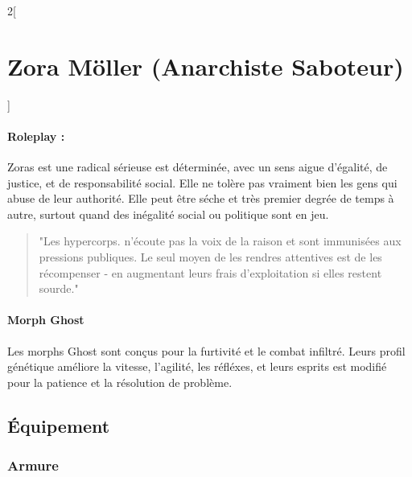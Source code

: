 \documentclass[a4paper,9pt]{article}
\begin{document}
\begin{multicols}{2}[\section*{Zora Möller (Anarchiste Saboteur)}]
   \paragraph{Roleplay :} Zoras est une radical sérieuse est déterminée, avec un sens aigue
   d'égalité, de justice, et de responsabilité social.
   Elle ne tolère pas vraiment bien les gens qui abuse de leur authorité.
   Elle peut être séche et très premier degrée de temps à autre, surtout quand des
   inégalité social ou politique sont en jeu.

   \begin{quote}
   "Les hypercorps. n'écoute pas la voix de la raison et sont immunisées aux
   pressions publiques. Le seul moyen de les rendres attentives est de les
   récompenser - en augmentant leurs frais d'exploitation si elles restent sourde."
\end{quote}

   \paragraph{Morph Ghost}
   Les morphs Ghost sont conçus pour la furtivité et le combat infiltré.
   Leurs profil génétique améliore la vitesse, l'agilité, les réfléxes, et
   leurs esprits est modifié pour la patience et la résolution de problème.

   \subsection*{Équipement}

   \subsubsection*{Armure}

\end{multicols}
\end{document}

